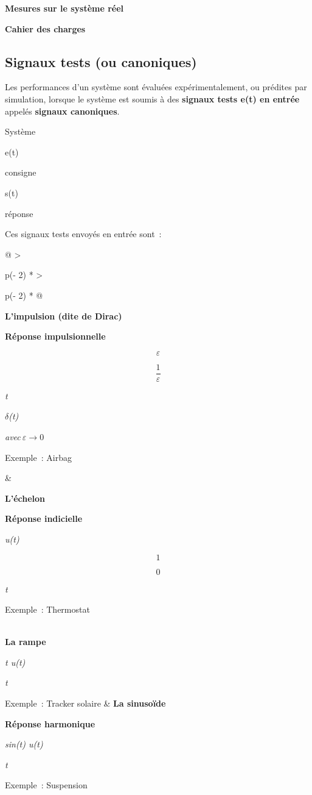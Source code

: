 \textbf{Mesures sur le système réel}

\textbf{Cahier des charges}

\subsection{Signaux tests (ou
canoniques)}\label{signaux-tests-ou-canoniques}

Les performances d'un système sont évaluées expérimentalement, ou
prédites par simulation, lorsque le système est soumis à des
\textbf{signaux tests e(t) en entrée} appelés \textbf{signaux
canoniques}.

Système

e(t)

consigne

s(t)

réponse

Ces signaux tests envoyés en entrée sont~:

\begin{longtable}[]{@{}
  >{\raggedright\arraybackslash}p{(\columnwidth - 2\tabcolsep) * }
  >{\raggedright\arraybackslash}p{(\columnwidth - 2\tabcolsep) * }@{}}
\toprule\noalign{}
\begin{minipage}[b]{\linewidth}\raggedright
\textbf{L'impulsion (dite de Dirac)}

\textbf{Réponse impulsionnelle}

\[\varepsilon\]

\[\frac{1}{\varepsilon}\]

\emph{t}

\emph{$\delta$(t)}

\emph{avec}\(\ \varepsilon \rightarrow 0\)

Exemple~: Airbag
\end{minipage} & \begin{minipage}[b]{\linewidth}\raggedright
\textbf{L'échelon}

\textbf{Réponse indicielle}


\emph{u(t)}

\[1\]

\[0\]

\emph{t}

Exemple~: Thermostat
\end{minipage} \\
\midrule\noalign{}
\endhead
\bottomrule\noalign{}
\endlastfoot
\textbf{La rampe}


\emph{t u(t)}

\emph{t}

Exemple~: Tracker solaire & \textbf{La sinusoïde}

\textbf{Réponse harmonique}


\emph{sin(t) u(t)}

\emph{t}

Exemple~: Suspension \\
\end{longtable}


